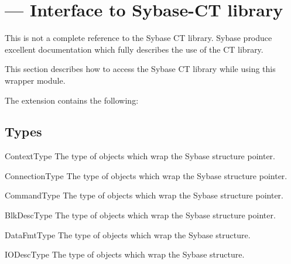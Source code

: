 \section{ --- Interface to Sybase-CT library}



This is not a complete reference to the Sybase CT library.  Sybase
produce excellent documentation which fully describes the use of the
CT library.

This section describes how to access the Sybase CT library while
using this wrapper module.

The  extension contains the following:

\subsection{Types}

\begin{datadesc}{ContextType}
The type of  objects which wrap the Sybase
 structure pointer.
\end{datadesc}

\begin{datadesc}{ConnectionType}
The type of  objects which wrap the Sybase
 structure pointer.
\end{datadesc}

\begin{datadesc}{CommandType}
The type of  objects which wrap the Sybase
 structure pointer.
\end{datadesc}

\begin{datadesc}{BlkDescType}
The type of  objects which wrap the Sybase
 structure pointer.
\end{datadesc}

\begin{datadesc}{DataFmtType}
The type of  objects which wrap the Sybase
 structure.
\end{datadesc}

\begin{datadesc}{IODescType}
The type of  objects which wrap the Sybase
 structure.
\end{datadesc}

